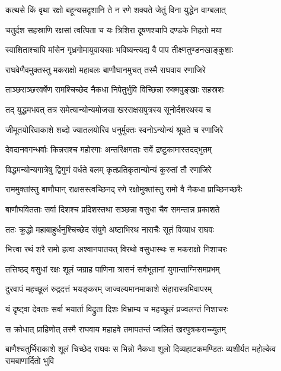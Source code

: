 \twolineshloka
{कत्थसे किं वृथा रक्षो बहून्यसदृशानि ते}
{न रणे शक्यते जेतुं विना युद्धेन वाग्बलात्} %

\twolineshloka
{चतुर्दश सहस्राणि रक्षसां त्वत्पिता च यः}
{त्रिशिरा दूषणश्चापि दण्डके निहतो मया} %

\twolineshloka
{स्वाशिताश्चापि मांसेन गृध्रगोमायुवायसाः}
{भविष्यन्त्यद्य वै पाप तीक्ष्णतुण्डनखाङ्कुशाः} %

\twolineshloka
{राघवेणैवमुक्तस्तु मकराक्षो महाबलः}
{बाणौघानमुचत् तस्मै राघवाय रणाजिरे} %

\twolineshloka
{ताञ्छराञ्छरवर्षेण रामश्चिच्छेद नैकधा}
{निपेतुर्भुवि विच्छिन्ना रुक्मपुङ्खाः सहस्रशः} %

\twolineshloka
{तद् युद्धमभवत् तत्र समेत्यान्योन्यमोजसा}
{खरराक्षसपुत्रस्य सूनोर्दशरथस्य च} %

\twolineshloka
{जीमूतयोरिवाकाशे शब्दो ज्यातलयोरिव}
{धनुर्मुक्तः स्वनोऽन्योन्यं श्रूयते च रणाजिरे} %

\twolineshloka
{देवदानवगन्धर्वाः किन्नराश्च महोरगाः}
{अन्तरिक्षगताः सर्वे द्रष्टुकामास्तदद्भुतम्} %

\twolineshloka
{विद्धमन्योन्यगात्रेषु द्विगुणं वर्धते बलम्}
{कृतप्रतिकृतान्योन्यं कुरुतां तौ रणाजिरे} %

\twolineshloka
{राममुक्तांस्तु बाणौघान् राक्षसस्त्वच्छिनद् रणे}
{रक्षोमुक्तांस्तु रामो वै नैकधा प्राच्छिनच्छरैः} %

\twolineshloka
{बाणौघवितताः सर्वा दिशश्च प्रदिशस्तथा}
{सञ्छन्ना वसुधा चैव समन्तान्न प्रकाशते} %

\twolineshloka
{ततः क्रुद्धो महाबाहुर्धनुश्चिच्छेद संयुगे}
{अष्टाभिरथ नाराचैः सूतं विव्याध राघवः} %

\twolineshloka
{भित्त्वा रथं शरै रामो हत्वा अश्वानपातयत्}
{विरथो वसुधास्थः स मकराक्षो निशाचरः} %

\twolineshloka
{तत्तिष्ठद् वसुधां रक्षः शूलं जग्राह पाणिना}
{त्रासनं सर्वभूतानां युगान्ताग्निसमप्रभम्} %

\twolineshloka
{दुरवापं महच्छूलं रुद्रदत्तं भयङ्करम्}
{जाज्वल्यमानमाकाशे संहारास्त्रमिवापरम्} %

\twolineshloka
{यं दृष्ट्वा देवताः सर्वा भयार्ता विद्रुता दिशः}
{विभ्राम्य च महच्छूलं प्रज्वलन्तं निशाचरः} %

\twolineshloka
{स क्रोधात् प्राहिणोत् तस्मै राघवाय महाहवे}
{तमापतन्तं ज्वलितं खरपुत्रकराच्च्युतम्} %

\threelineshloka
{बाणैश्चतुर्भिराकाशे शूलं चिच्छेद राघवः}
{स भिन्नो नैकधा शूलो दिव्यहाटकमण्डितः}
{व्यशीर्यत महोल्केव रामबाणार्दितो भुवि} %

